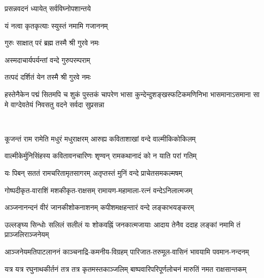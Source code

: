

{प्रसन्नवदनं ध्यायेत् सर्वविघ्नोपशान्तये}

{यं नत्वा कृतकृत्याः स्युस्तं नमामि गजाननम्}


{गुरुः साक्षात् परं ब्रह्म तस्मै श्री गुरवे नमः}

{अस्मदाचार्यपर्यन्तां वन्दे गुरुपरम्पराम्}

{तत्पदं दर्शितं येन तस्मै श्री गुरवे नमः}

\pagebreak[4]
{हस्तेनैकेन पद्मं सितमपि च शुकं पुस्तकं चापरेण}
{भासा कुन्देन्दुशङ्खस्फटिकमणिनिभा भासमानाऽसमाना}
{सा मे वाग्देवतेयं निवसतु वदने सर्वदा सुप्रसन्ना}

\mbox{}\\

\twolineshloka
{कूजन्तं राम रामेति मधुरं मधुराक्षरम्}
{आरुह्य कविताशाखां वन्दे वाल्मीकिकोकिलम्}

\twolineshloka
{वाल्मीकेर्मुनिसिंहस्य कवितावनचारिणः}
{शृण्वन् रामकथानादं को न याति परां गतिम्}

\twolineshloka
{यः पिबन् सततं रामचरितामृतसागरम्}
{अतृप्तस्तं मुनिं वन्दे प्राचेतसमकल्मषम्}

\resetShloka
{}\nopagebreak[4]

\twolineshloka
{गोष्पदीकृत-वाराशिं मशकीकृत-राक्षसम्}
{रामायण-महामाला-रत्नं वन्देऽनिलात्मजम्}

\twolineshloka
{अञ्जनानन्दनं वीरं जानकीशोकनाशनम्}
{कपीशमक्षहन्तारं वन्दे लङ्काभयङ्करम्}

\twolineshloka
{उल्लङ्घ्य सिन्धोः सलिलं सलीलं यः शोकवह्निं जनकात्मजायाः}
{आदाय तेनैव ददाह लङ्कां नमामि तं प्राञ्जलिराञ्जनेयम्}

\twolineshloka
{आञ्जनेयमतिपाटलाननं काञ्चनाद्रि-कमनीय-विग्रहम्}
{पारिजात-तरुमूल-वासिनं भावयामि पवमान-नन्दनम्}

\twolineshloka
{यत्र यत्र रघुनाथकीर्तनं तत्र तत्र कृतमस्तकाञ्जलिम्}
{बाष्पवारिपरिपूर्णलोचनं मारुतिं नमत राक्षसान्तकम्}

